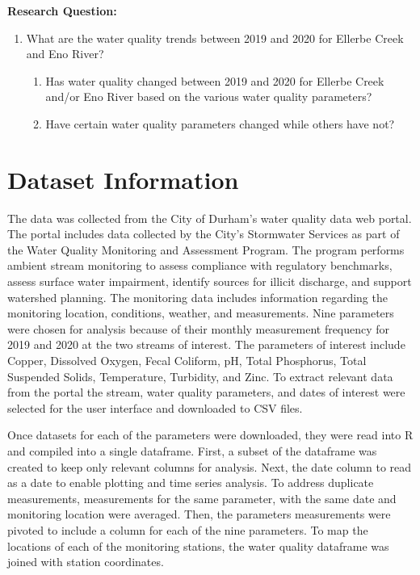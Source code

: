 \documentclass[
  12pt,
]{article}
\providecommand{\tightlist}{%
  \setlength{\itemsep}{0pt}\setlength{\parskip}{0pt}}
\begin{document}
\textbf{Research Question:}

\begin{enumerate}
\def\labelenumi{\arabic{enumi}.}
\tightlist
\item
  What are the water quality trends between 2019 and 2020 for Ellerbe
  Creek and Eno River?

  \begin{enumerate}
  \def\labelenumii{\alph{enumii}.}
  \tightlist
  \item
    Has water quality changed between 2019 and 2020 for Ellerbe Creek
    and/or Eno River based on the various water quality parameters?
  \item
    Have certain water quality parameters changed while others have not?
  \end{enumerate}
\end{enumerate}

\newpage

\hypertarget{dataset-information}{%
\section{Dataset Information}\label{dataset-information}}

The data was collected from the City of Durham's water quality data web
portal. The portal includes data collected by the City's Stormwater
Services as part of the Water Quality Monitoring and Assessment Program.
The program performs ambient stream monitoring to assess compliance with
regulatory benchmarks, assess surface water impairment, identify sources
for illicit discharge, and support watershed planning. The monitoring
data includes information regarding the monitoring location, conditions,
weather, and measurements. Nine parameters were chosen for analysis
because of their monthly measurement frequency for 2019 and 2020 at the
two streams of interest. The parameters of interest include Copper,
Dissolved Oxygen, Fecal Coliform, pH, Total Phosphorus, Total Suspended
Solids, Temperature, Turbidity, and Zinc. To extract relevant data from
the portal the stream, water quality parameters, and dates of interest
were selected for the user interface and downloaded to CSV files.

Once datasets for each of the parameters were downloaded, they were read
into R and compiled into a single dataframe. First, a subset of the
dataframe was created to keep only relevant columns for analysis. Next,
the date column to read as a date to enable plotting and time series
analysis. To address duplicate measurements, measurements for the same
parameter, with the same date and monitoring location were averaged.
Then, the parameters measurements were pivoted to include a column for
each of the nine parameters. To map the locations of each of the
monitoring stations, the water quality dataframe was joined with station
coordinates.
\end{document}
